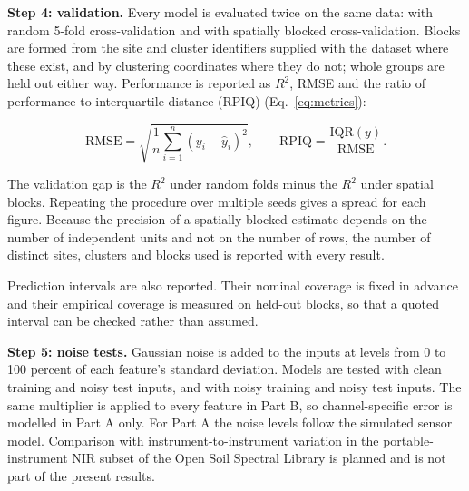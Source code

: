 \documentclass[conference]{IEEEtran}
\begin{document}
\noindent\textbf{Step 4: validation.}
Every model is evaluated twice on the same data: with random 5-fold
cross-validation and with spatially blocked cross-validation. Blocks are formed
from the site and cluster identifiers supplied with the dataset where these
exist, and by clustering coordinates where they do not; whole groups are held
out either way. Performance is reported as $R^2$, RMSE and the ratio of
performance to interquartile distance (RPIQ) (Eq.~\ref{eq:metrics}):

\begin{equation}
\mathrm{RMSE}=\sqrt{\frac{1}{n}\sum_{i=1}^{n}(y_i-\hat{y}_i)^2},
\qquad
\mathrm{RPIQ}=\frac{\mathrm{IQR}(y)}{\mathrm{RMSE}}.
\label{eq:metrics}
\end{equation}

The validation gap is the $R^2$ under random folds minus the $R^2$ under spatial
blocks. Repeating the procedure over multiple seeds gives a spread for each
figure. Because the precision of a spatially blocked estimate depends on the
number of independent units and not on the number of rows, the number of distinct
sites, clusters and blocks used is reported with every result.

Prediction intervals are also reported. Their nominal coverage is fixed in
advance and their empirical coverage is measured on held-out blocks, so that a
quoted interval can be checked rather than assumed.

\noindent\textbf{Step 5: noise tests.} Gaussian noise is added to the inputs at
levels from 0 to 100 percent of each feature's standard deviation. Models are
tested with clean training and noisy test inputs, and with noisy training and
noisy test inputs.
The same multiplier is applied to every feature in Part B, so channel-specific
error is modelled in Part A only. For Part A the noise levels follow the
simulated sensor model. Comparison with instrument-to-instrument variation in the
portable-instrument NIR subset of the Open Soil Spectral Library is planned and is
not part of the present results.
\end{document}
